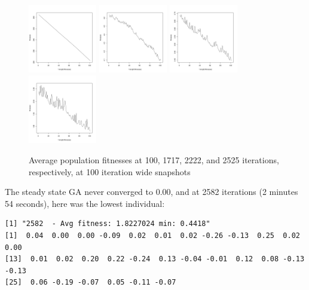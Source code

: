 \documentclass[12pt]{article}
\begin{document}
\begin{figure}[!h]
        \begin{center}
		\includegraphics[width=30mm]{images/ss/avg_101.pdf}
		\includegraphics[width=30mm]{images/ss/avg_1717.pdf}
		\includegraphics[width=30mm]{images/ss/avg_2222.pdf}
		\includegraphics[width=30mm]{images/ss/avg_2525.pdf}
               	\caption{Average population fitnesses at 100, 1717, 2222, and 2525 iterations, respectively, at 100 iteration wide snapshots}
                \label{ss_avg_pop_fit}
        \end{center}
\end{figure}

The steady state GA never converged to 0.00, and at 2582 iterations (2 minutes 54 seconds), here was the lowest individual:
\scriptsize
\begin{lstlisting}
[1] "2582  - Avg fitness: 1.8227024 min: 0.4418"
[1]  0.04  0.00  0.00 -0.09  0.02  0.01  0.02 -0.26 -0.13  0.25  0.02  0.00
[13]  0.01  0.02  0.20  0.22 -0.24  0.13 -0.04 -0.01  0.12  0.08 -0.13 -0.13
[25]  0.06 -0.19 -0.07  0.05 -0.11 -0.07
\end{lstlisting}
\normalsize
\end{document}
